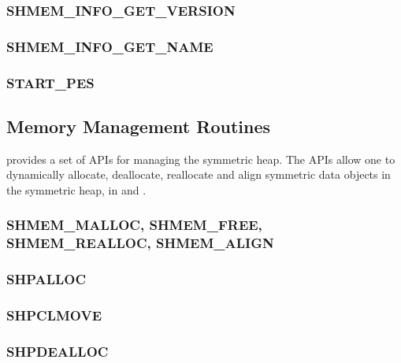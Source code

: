 \documentclass[10pt]{book}
\begin{document}
\subsubsection{\textbf{SHMEM\_INFO\_GET\_VERSION}}\label{subsec:shmem_info_get_version}


\subsubsection{\textbf{SHMEM\_INFO\_GET\_NAME}}\label{subsec:shmem_info_get_name}


\subsubsection{\textbf{START\_PES}}\label{subsec:start_pes}






\subsection{Memory Management Routines}
\openshmem provides a set of \ac{API}s for managing the symmetric heap. The
\ac{API}s allow one to dynamically allocate, deallocate, reallocate and align
symmetric data objects in the symmetric heap, in \Clang{} and \Fortran.

\subsubsection{\textbf{SHMEM\_MALLOC, SHMEM\_FREE, SHMEM\_REALLOC, SHMEM\_ALIGN}}\label{subsec:shfree}


\subsubsection{\textbf{SHPALLOC}}\label{subsec:shpalloc}


\subsubsection{\textbf{SHPCLMOVE}}\label{subsec:shpclmove}


\subsubsection{\textbf{SHPDEALLOC}}\label{subsec:shpdealloc}

\end{document}
